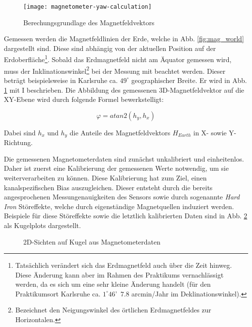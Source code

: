 \begin{figure}[h]
   \centering
   \texttt{[image: magnetometer-yaw-calculation]}
   \caption[mag_mapping]{Berechungsgrundlage des Magnetfeldvektors\cite{wang2006intelligent}}
   \label{fig:mag_mapping}
\end{figure}

Gemessen werden die Magnetfeldlinien der Erde, welche in Abb. \ref{fig:mag_world} dargestellt sind.
Diese sind abhängig von der aktuellen Position auf der Erdoberfläche\footnote{Tatsächlich verändert sich das Erdmagnetfeld auch über die Zeit hinweg.
Diese Änderung kann aber im Rahmen des Praktikums vernachlässigt werden, da es sich um eine sehr kleine Änderung handelt (\zB für den Praktikumsort Karlsruhe ca. $1^\circ 46$'~$7.8$ arcmin/Jahr im Deklinationswinkel).}.
Sobald das Erdmagnetfeld nicht am Äquator gemessen wird, muss der Inklinationswinkel\footnote{Bezeichnet den Neigungswinkel des örtlichen Erdmagnetfeldes zur Horizontalen.} bei der Messung mit beachtet werden. Dieser beträgt beispielsweise in Karlsruhe ca. $49^\circ$ geographischer Breite. Er wird in Abb. \ref{fig:mag_mapping} mit I beschrieben.
Die Abbildung des gemessenen 3D-Magnetfeldvektor auf die XY-Ebene wird durch folgende Formel bewerkstelligt:

\begin{equation}
    \varphi = atan2(h_y,h_x)
\end{equation}

Dabei sind $h_x$ und $h_y$ die Anteile des Magnetfeldvektors $H_{Earth}$ in X- sowie Y-Richtung.

Die gemessenen Magnetometerdaten sind zunächst unkalibriert und einheitenlos.
Daher ist zuerst eine Kalibrierung der gemessenen Werte notwendig, um sie weiterverarbeiten zu können.
Diese Kalibrierung hat zum Ziel, einen kanalspezifischen Bias auszugleichen. 
Dieser entsteht durch die bereits angesprochenen Messungenauigkeiten des Sensors sowie durch sogenannte \textit{Hard Iron} Störeffekte, welche durch eigenständige Magnetquellen induziert werden.
Beispiele für diese Störeffekte sowie die letztlich kalibrierten Daten sind in Abb. \ref{fig:mag_kugel_plots} als Kugelplots dargestellt.

\begin{figure}[ht]
\centering
{}

\caption[]{2D-Sichten auf Kugel aus Magnetometerdaten}
\label{fig:mag_kugel_plots}
\end{figure}

